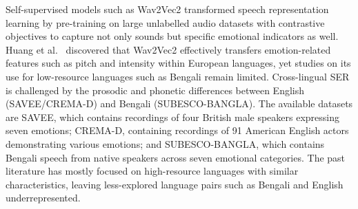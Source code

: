 \documentclass[conference]{IEEEtran}
\begin{document}
Self-supervised models such as Wav2Vec2 transformed speech representation learning by
pre-training on large unlabelled audio datasets with contrastive objectives to capture not only
sounds but specific emotional indicators as well. Huang et al.~\cite{huang2021} discovered
that Wav2Vec2 effectively transfers emotion-related features such as pitch and intensity within
European languages, yet studies on its use for low-resource languages such as Bengali remain
limited. Cross-lingual SER is challenged by the prosodic and phonetic differences between
English (SAVEE/CREMA-D) and Bengali (SUBESCO-BANGLA). The available datasets are
SAVEE, which contains recordings of four British male speakers expressing seven emotions;
CREMA-D, containing recordings of 91 American English actors demonstrating various
emotions; and SUBESCO-BANGLA, which contains Bengali speech from native speakers
across seven emotional categories. The past literature has mostly focused on high-resource
languages with similar characteristics, leaving less-explored language pairs such as Bengali
and English underrepresented.
\end{document}
